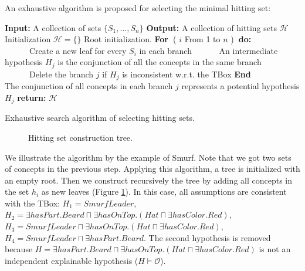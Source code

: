 \documentclass{article}
\begin{document}
An exhaustive algorithm is proposed for selecting the minimal hitting set:

\begin{algorithm}[H]
\textbf{Input:} A collection of sets $\{S_1,\dots,S_n\}$\;
\textbf{Output:} A collection of hitting sets $\mathcal{H}$\;
Initialization\:
$\mathcal{H}=\{\}$\;
Root initialization.\;
\textbf{For~}( $i$ From 1 to $n$ )\textbf{~do:}\\
~~~~~~Create a new leaf for every  $S_i$  in each branch\;
~~~~~~An intermediate hypothesis $H_{j}$ is the conjunction of all the concepts in the same branch\;
~~~~~~Delete the branch $j$ if $H_{j}$ is inconsistent w.r.t. the TBox\;
\textbf{End}\\
The conjunction of all concepts in each branch $j$ represents a potential hypothesis $H_j$\;
\textbf{return:} $\mathcal{H}$\;
\caption{Exhaustive search algorithm of selecting hitting sets.}\label{algo:exhaustive}
\end{algorithm}


\begin{figure}
\centering
{}
\caption{Hitting set construction tree.\label{fig:hittingtree}}
\end{figure}
We illustrate the algorithm by the example of Smurf. Note that we got two sets of concepts in the previous step.
Applying this algorithm, a tree is initialized with an empty root. Then we construct recursively the tree by adding all concepts
in the set $h_i$ as new leaves (Figure \ref{fig:hittingtree}). In this case, all
assumptions are consistent with the TBox:
$H_1=SmurfLeader$, $H_2=\exists hasPart.Beard \sqcap \exists hasOnTop.(Hat\sqcap\exists hasColor.Red)$, 
$H_3=SmurfLeader\sqcap\exists hasOnTop.(Hat\sqcap \exists hasColor.Red)$, $H_4=SmurfLeader \sqcap \exists hasPart.Beard$. 
The second hypothesis is removed because $H=\exists hasPart.Beard \sqcap \exists hasOnTop.(Hat\sqcap\exists hasColor.Red)$ 
is not an independent explainable hypothesis ($H\vDash \mathcal{O}$). 
\end{document}
